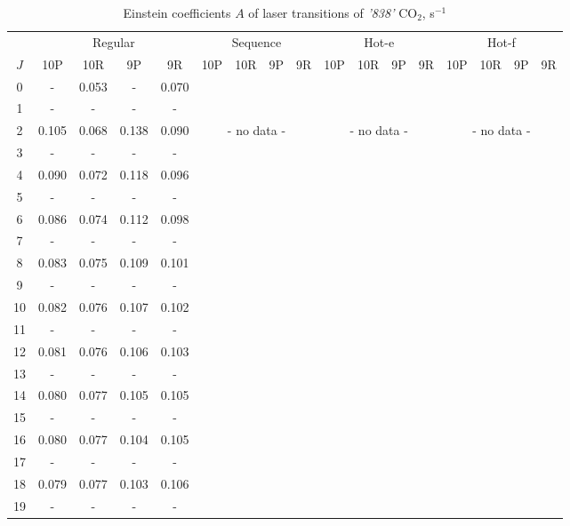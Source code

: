 \documentclass{report}
\begin{document}
\begin{appendices}
\begin{table}
\centering
\caption{Einstein coefficients $A$ of laser transitions of \textit{'838'} {CO$_2$}, s$^{-1}$}
\label{table:A838}
\scriptsize
\begin{tabular}{|c|cccc|cccc|cccc|cccc|}
\hline
& \multicolumn{4}{c|}{Regular}& \multicolumn{4}{c|}{Sequence}& \multicolumn{4}{c|}{Hot-e}& \multicolumn{4}{c|}{Hot-f}\\
$J$ & 10P & 10R & 9P & 9R & 10P & 10R & 9P & 9R & 10P & 10R & 9P & 9R & 10P & 10R & 9P & 9R\\ 
\hline
0  &   -   & 0.053 &   -   & 0.070 & & & & & & & & & & & &\\
1  &   -   &   -   &   -   &   -   & & & & & & & & & & & &\\
2  & 0.105 & 0.068 & 0.138 & 0.090 & \multicolumn{4}{c|}{- no data -}& \multicolumn{4}{c|}{- no data -}& \multicolumn{4}{c|}{- no data -}\\
3  &   -   &   -   &   -   &   -   & & & & & & & & & & & &\\
4  & 0.090 & 0.072 & 0.118 & 0.096 & & & & & & & & & & & &\\
5  &   -   &   -   &   -   &   -   & & & & & & & & & & & &\\
6  & 0.086 & 0.074 & 0.112 & 0.098 & & & & & & & & & & & &\\
7  &   -   &   -   &   -   &   -   & & & & & & & & & & & &\\
8  & 0.083 & 0.075 & 0.109 & 0.101 & & & & & & & & & & & &\\
9  &   -   &   -   &   -   &   -   & & & & & & & & & & & &\\
10 & 0.082 & 0.076 & 0.107 & 0.102 & & & & & & & & & & & &\\
11 &   -   &   -   &   -   &   -   & & & & & & & & & & & &\\
12 & 0.081 & 0.076 & 0.106 & 0.103 & & & & & & & & & & & &\\
13 &   -   &   -   &   -   &   -   & & & & & & & & & & & &\\
14 & 0.080 & 0.077 & 0.105 & 0.105 & & & & & & & & & & & &\\
15 &   -   &   -   &   -   &   -   & & & & & & & & & & & &\\
16 & 0.080 & 0.077 & 0.104 & 0.105 & & & & & & & & & & & &\\
17 &   -   &   -   &   -   &   -   & & & & & & & & & & & &\\
18 & 0.079 & 0.077 & 0.103 & 0.106 & & & & & & & & & & & &\\
19 &   -   &   -   &   -   &   -   & & & & & & & & & & & &\\

\end{tabular}
\end{table}
\end{appendices}
\end{document}
